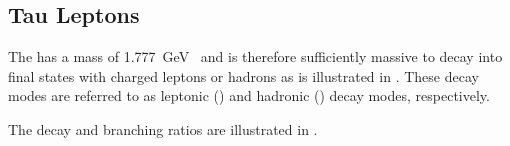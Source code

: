 \subsection{Tau Leptons}%
\label{sec:tau_rec}

The \taulepton has a mass of \SI{1.777}{\GeV}~\cite{pdg2020} and is therefore
sufficiently massive to decay into final states with charged leptons or hadrons
as is illustrated in . These decay modes are referred to
as leptonic (\taulep) and hadronic (\tauhad) decay modes, respectively.


The \taulepton decay and branching ratios are illustrated in
.



